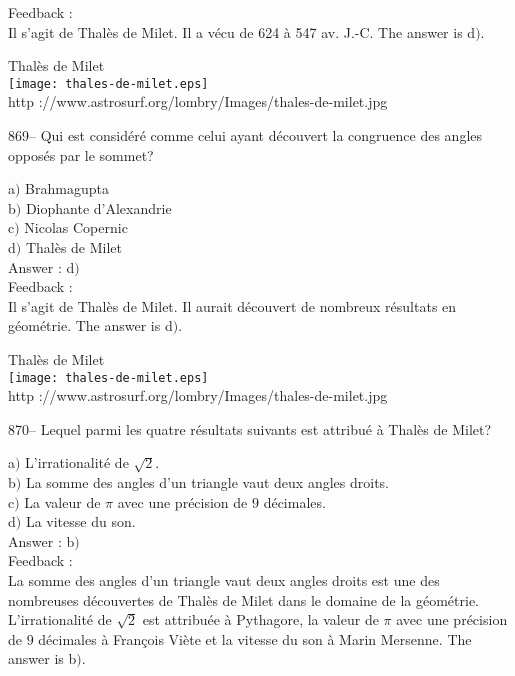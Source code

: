 ﻿\documentclass[letterpaper, 12pt]{article}
\begin{document}
Feedback :\\
Il s'agit de Thal\`es de Milet. Il a v\'ecu de 624 \`a 547 av. J.-C.
The answer is d$)$.

        \begin{center}
        Thal\`es de Milet\\
    \texttt{[image: thales-de-milet.eps]}\\
        {\footnotesize http
://www.astrosurf.org/lombry/Images/thales-de-milet.jpg}
    \end{center}

869-- Qui est consid\'er\'e comme celui ayant d\'ecouvert la
congruence des angles oppos\'es par le sommet?

a$)$ Brahmagupta \\
b$)$ Diophante d'Alexandrie \\
c$)$ Nicolas Copernic \\
d$)$ Thal\`es de Milet \\

Answer : d$)$\\

Feedback :\\
Il s'agit de Thal\`es de Milet. Il aurait d\'ecouvert de nombreux
r\'esultats en g\'eom\'etrie. The answer is d$)$.

        \begin{center}
        Thal\`es de Milet\\
    \texttt{[image: thales-de-milet.eps]}\\
        {\footnotesize http
://www.astrosurf.org/lombry/Images/thales-de-milet.jpg}
    \end{center}

870-- Lequel parmi les quatre r\'esultats suivants est attribu\'e
\`a Thal\`es de Milet?

a$)$ L'irrationalit\'e de $\sqrt2$. \\
b$)$ La somme des angles d'un triangle vaut deux angles droits. \\
c$)$ La valeur de $\pi$ avec une pr\'ecision de $9$ d\'ecimales. \\
d$)$ La vitesse du son. \\

Answer : b$)$\\

Feedback : \\
La somme des angles d'un triangle vaut deux angles droits est une
des nombreuses d\'ecouvertes de Thal\`es de Milet dans le domaine de
la g\'eom\'etrie. L'irrationalit\'e de $\sqrt2$ est attribu\'ee \`a
Pythagore, la valeur de $\pi$ avec une pr\'ecision de $9$
d\'ecimales \`a Fran\c cois Vi\`ete
et la vitesse du son \`a Marin Mersenne. The answer is b$)$.\\
\end{document}

